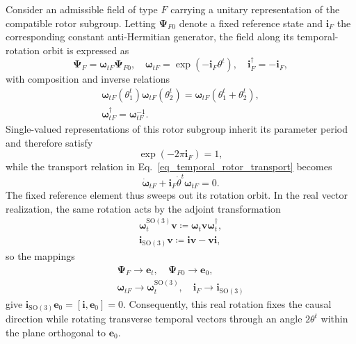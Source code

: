 Consider an admissible field of type $F$ carrying a unitary representation of the compatible rotor subgroup. Letting $\boldsymbol{\Psi}_{F0}$ denote a fixed reference state and $\mathbf{i}_{F}$ the corresponding constant anti-Hermitian generator, the field along its temporal-rotation orbit is expressed as
\begin{equation}\label{eq_generalized_psi}
    \boldsymbol{\Psi}_{F}=\boldsymbol{\omega}_{tF}\boldsymbol{\Psi}_{F0},\quad \boldsymbol{\omega}_{tF}=\exp(-\mathbf{i}_{F}\theta^{t}),\quad \mathbf{i}_{F}^{\dagger}=-\mathbf{i}_{F},
\end{equation}
with composition and inverse relations
\begin{equation}
\begin{gathered}
    \boldsymbol{\omega}_{tF}(\theta_{1}^{t})\boldsymbol{\omega}_{tF}(\theta_{2}^{t})=\boldsymbol{\omega}_{tF}(\theta_{1}^{t}+\theta_{2}^{t}),\\
    \boldsymbol{\omega}_{tF}^{\dagger}=\boldsymbol{\omega}_{tF}^{-1}.
\end{gathered}
\end{equation}
Single-valued representations of this rotor subgroup inherit its parameter period and therefore satisfy
\begin{equation}
    \exp(-2\pi\mathbf{i}_{F})=1,
\end{equation}
while the transport relation in Eq.~\eqref{eq_temporal_rotor_transport} becomes
\begin{equation}\label{eq_starting_rotor_evolution}
    \dot{\boldsymbol{\omega}}_{tF}+\mathbf{i}_{F}\dot{\theta}^{t}\boldsymbol{\omega}_{tF}=0.
\end{equation}
The fixed reference element thus sweeps out its rotation orbit. In the real vector realization, the same rotation acts by the adjoint transformation
\begin{equation}
\begin{gathered}
    \boldsymbol{\omega}_{t}^{\mathrm{SO}(3)}\mathbf{v}\coloneqq\boldsymbol{\omega}_{t}\mathbf{v}\boldsymbol{\omega}_{t}^{\dagger},\\
    \mathbf{i}_{\mathrm{SO}(3)}\mathbf{v}\coloneqq\mathbf{i}\mathbf{v}-\mathbf{v}\mathbf{i},
\end{gathered}
\end{equation}
so the mappings
\begin{equation}
\begin{gathered}
    \boldsymbol{\Psi}_{F}\to\mathbf{e}_{t},\quad\boldsymbol{\Psi}_{F0}\to\mathbf{e}_{0},\\
    \boldsymbol{\omega}_{tF}\to\boldsymbol{\omega}_{t}^{\mathrm{SO}(3)},\quad\mathbf{i}_{F}\to\mathbf{i}_{\mathrm{SO}(3)}
\end{gathered}
\end{equation}
give $\mathbf{i}_{\mathrm{SO}(3)}\mathbf{e}_{0}=[\mathbf{i},\mathbf{e}_{0}]=0$. Consequently, this real rotation fixes the causal direction while rotating transverse temporal vectors through an angle $2\theta^{t}$ within the plane orthogonal to $\mathbf{e}_{0}$.

